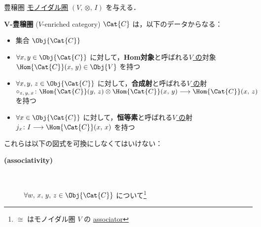 \documentclass[TQFT_main]{subfiles}
\begin{document}
\begin{mydef}[label=def:enriched,breakable]{豊穣圏}
    \hyperref[redef:monoidal-category]{モノイダル圏} $(V,\, \otimes,\, I)$ を与える．

    $\bm{V}$\textbf{-豊穣圏} ($V$-enriched category) $\Cat{C}$ は，以下のデータからなる：
    \begin{itemize}
        \item 集合 $\Obj{\Cat{C}}$
        \item $\forall x, y \in \Obj{\Cat{C}}$ に対して，\textbf{Hom対象}と呼ばれる\underline{$V$ の}対象 $\Hom{\Cat{C}}(x,\, y) \in \Obj{V}$ を持つ
        \item $\forall x, y,\, z \in \Obj{\Cat{C}}$ に対して，\textbf{合成射}と呼ばれる\underline{$V$ の}射 $\circ_{z,\, y,\, x} \colon \Hom{\Cat{C}}(y,\, z) \otimes \Hom{\Cat{C}}(x,\, y) \lto \Hom{\Cat{C}} (x,\, z)$ を持つ
        \item $\forall x \in \Obj{\Cat{C}}$ に対して，\textbf{恒等素}と呼ばれる\underline{$V$ の}射 $j_x \colon I \lto \Hom{\Cat{C}} (x,\, x)$ を持つ
    \end{itemize}
    これらは以下の図式を可換にしなくてはいけない：
    \begin{description}
        \item[\textbf{(associativity)}]　
        
        $\forall w,\, x,\, y,\, z \in \Obj{\Cat{C}}$ について\footnote{$\cong$ はモノイダル圏 $V$ の \hyperref[def:monoidal-category]{associator}}
        \begin{flushleft}
        \end{flushleft}
        

\end{description}
\end{mydef}
\end{document}
